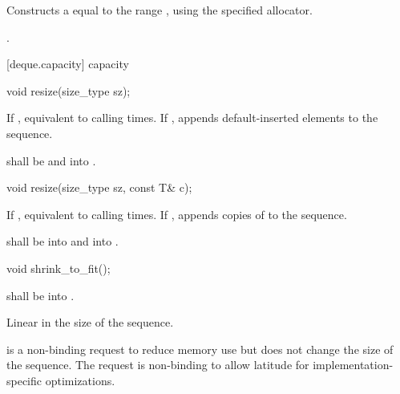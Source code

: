 \begin{itemdescr}
\pnum
\effects
Constructs a
equal to the range
,
using the specified allocator.

\pnum
\complexity
{}.
\end{itemdescr}

[deque.capacity]{ capacity}

%
\begin{itemdecl}
void resize(size_type sz);
\end{itemdecl}

\begin{itemdescr}
\pnum
\effects If , equivalent to calling
  times.
If ,
appends  default-inserted elements to the
sequence.

\pnum
\requires {} shall be  and  into .
\end{itemdescr}

%
\begin{itemdecl}
void resize(size_type sz, const T& c);
\end{itemdecl}

\begin{itemdescr}
\pnum
\effects If , equivalent to calling
  times. If ,
appends  copies of  to the sequence.

\pnum
\requires {} shall be  into  and
 into .
\end{itemdescr}

%
%
\begin{itemdecl}
void shrink_to_fit();
\end{itemdecl}

\begin{itemdescr}
\pnum
\requires {} shall be  into .

\pnum
\complexity Linear in the size of the sequence.

\pnum
\remarks {} is a non-binding request to reduce memory use
but does not change the size of the sequence. \enternote The request is non-binding to allow latitude for implementation-specific optimizations. \exitnote
\end{itemdescr}

